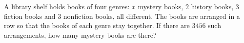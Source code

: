 A library shelf holds books of four genres: $x$ mystery books, $2$ history books, $3$ fiction books and $3$ nonfiction books, all different. The books are arranged in a row so that the books of each genre stay together. If there are $3456$ such arrangements, how many mystery books are there?
